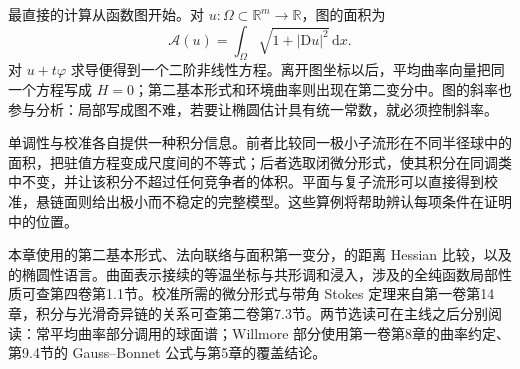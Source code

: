 \ProseParagraphBreak

最直接的计算从函数图开始。对 \(u:\Omega\subset\mathbb R^m\to\mathbb R\)，图的面积为
\[
	\mathcal A(u)=\int_\Omega\sqrt{1+|\mathrm Du|^2}\,\mathrm dx.
\]
对 \(u+t\varphi\) 求导便得到一个二阶非线性方程。离开图坐标以后，平均曲率向量把同一个方程写成 \(H=0\)；第二基本形式和环境曲率则出现在第二变分中。图的斜率也参与分析：局部写成图不难，若要让椭圆估计具有统一常数，就必须控制斜率。

\ProseParagraphBreak

单调性与校准各自提供一种积分信息。前者比较同一极小子流形在不同半径球中的面积，把驻值方程变成尺度间的不等式；后者选取闭微分形式，使其积分在同调类中不变，并让该积分不超过任何竞争者的体积。平面与复子流形可以直接得到校准，悬链面则给出极小而不稳定的完整模型。这些算例将帮助辨认每项条件在证明中的位置。

\ProseParagraphBreak

本章使用的第二基本形式、法向联络与面积第一变分，的距离 Hessian 比较，以及的椭圆性语言。曲面表示接续的等温坐标与共形调和浸入，涉及的全纯函数局部性质可查第四卷第1.1节。校准所需的微分形式与带角 Stokes 定理来自第一卷第14章，积分与光滑奇异链的关系可查第二卷第7.3节。两节选读可在主线之后分别阅读：常平均曲率部分调用的球面谱；Willmore 部分使用第一卷第8章的曲率约定、第9.4节的 Gauss--Bonnet 公式与第5章的覆盖结论。









